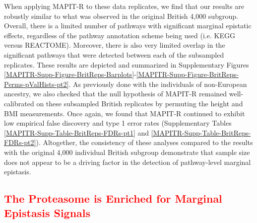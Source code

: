 \documentclass[10pt]{article}
\begin{document}
When applying MAPIT-R to these data replicates, we find that our results are robustly similar to what was observed in the original British 4,000 subgroup. Overall, there is a limited number of pathways with significant marginal epistatic effects, regardless of the pathway annotation scheme being used (i.e. KEGG versus REACTOME). Moreover, there is also very limited overlap in the significant pathways that were detected between each of the subsampled replicates. These results are depicted and summarized in Supplementary Figures \ref{MAPITR-Supp-Figure-BritReps-Barplots}-\ref{MAPITR-Supp-Figure-BritReps-Perms-pValHists-pt2}. As previously done with the individuals of non-European ancestry, we also checked that the null hypothesis of MAPIT-R remained well-calibrated on these subsampled British replicates by permuting the height and BMI measurements. Once again, we found that MAPIT-R continued to exhibit low empirical false discovery and type 1 error rates (Supplementary Tables \ref{MAPITR-Supp-Table-BritReps-FDRs-pt1} and \ref{MAPITR-Supp-Table-BritReps-FDRs-pt2}). Altogether, the consistency of these analyses compared to the results with the original 4,000 individual British subgroup demonstrate that sample size does not appear to be a driving factor in the detection of pathway-level marginal epistasis.

\subsection*{\textcolor{red}{The Proteasome is Enriched for Marginal Epistasis Signals}}
\end{document}

